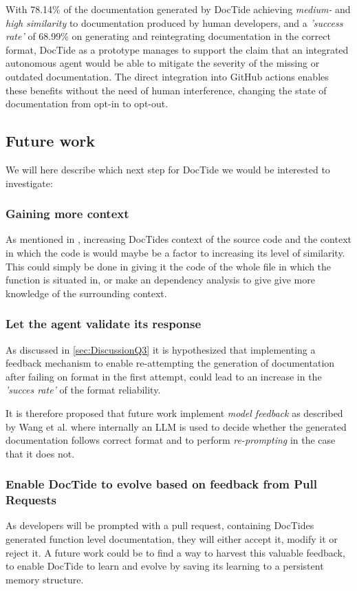 With 78.14\% of the documentation generated by DocTide achieving \textit{medium-} and \textit{high similarity} to documentation produced by human developers, and a \textit{'success rate'} of 68.99\% on generating and reintegrating documentation in the correct format, DocTide as a prototype manages to support the claim that an integrated autonomous agent would be able to mitigate the severity of the missing or outdated documentation. The direct integration into GitHub actions enables these benefits without the need of human interference, changing the state of documentation from opt-in to opt-out.

\subsection{Future work}
We will here describe which next step for DocTide we would be interested to investigate:
\subsubsection*{Gaining more context}
As mentioned in , increasing DocTides context of the source code and the context in which the code is would maybe be a factor to increasing its level of similarity. This could simply be done in giving it the code of the whole file in which the function is situated in, or make an dependency analysis to give give more knowledge of the surrounding context.
\subsubsection*{Let the agent validate its response}
As discussed in \cref{sec:DiscussionQ3} it is hypothesized that implementing a feedback mechanism to enable re-attempting the generation of documentation after failing on format in the first attempt, could lead to an increase in the \textit{'succes rate'} of the format reliability.

It is therefore proposed that future work implement \textit{model feedback} as described by Wang et al.\cite{wang2024survey} where internally an LLM is used to decide whether the generated documentation follows correct format and to perform \textit{re-prompting} in the case that it does not.

\subsubsection*{Enable DocTide to evolve based on feedback from Pull Requests}
As developers will be prompted with a pull request, containing DocTides generated function level documentation, they will either accept it, modify it or reject it. A future work could be to find a way to harvest this valuable feedback, to enable DocTide to learn and evolve by saving its learning to a persistent memory structure.
